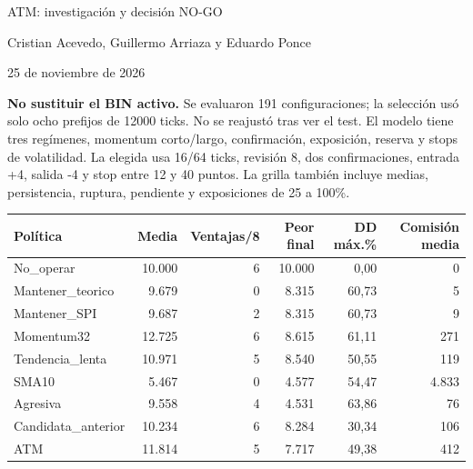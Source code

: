 \documentclass[11pt,a4paper]{article}
\begin{document}
\begin{center}{\LARGE ATM: investigación y decisión NO-GO}\par
Cristian Acevedo, Guillermo Arriaza y Eduardo Ponce\par 25 de noviembre de 2026\end{center}
\textbf{No sustituir el BIN activo.} Se evaluaron 191 configuraciones; la selección
usó solo ocho prefijos de 12000 ticks. No se reajustó tras ver el test.
El modelo tiene tres regímenes, momentum corto/largo, confirmación, exposición,
reserva y stops de volatilidad. La elegida usa 16/64 ticks, revisión 8, dos
confirmaciones, entrada +4, salida -4 y stop entre 12 y 40 puntos. La grilla
también incluye medias, persistencia, ruptura, pendiente y exposiciones de 25 a 100\%.

\begin{center}\small\begin{tabular}{lrrrrr}\toprule
Política & Media & Ventajas/8 & Peor final & DD máx.\% & Comisión media\\\midrule
No\_operar & 10.000 & 6 & 10.000 & 0,00 & 0 \\
Mantener\_teorico & 9.679 & 0 & 8.315 & 60,73 & 5 \\
Mantener\_SPI & 9.687 & 2 & 8.315 & 60,73 & 9 \\
Momentum32 & 12.725 & 6 & 8.615 & 61,11 & 271 \\
Tendencia\_lenta & 10.971 & 5 & 8.540 & 50,55 & 119 \\
SMA10 & 5.467 & 0 & 4.577 & 54,47 & 4.833 \\
Agresiva & 9.558 & 4 & 4.531 & 63,86 & 76 \\
Candidata\_anterior & 10.234 & 6 & 8.284 & 30,34 & 106 \\
ATM & 11.814 & 5 & 7.717 & 49,38 & 412 \\
\bottomrule\end{tabular}\end{center}
\begin{center}\end{center}
\end{document}
